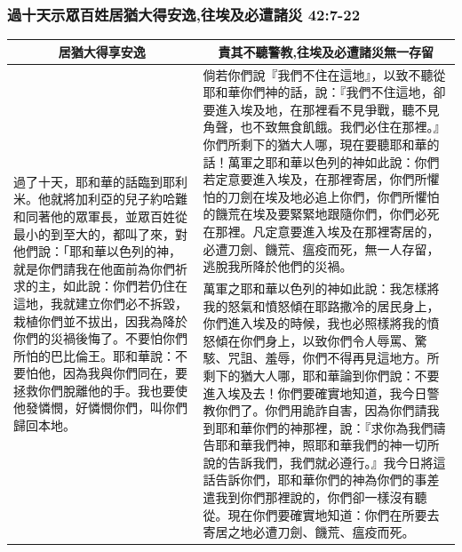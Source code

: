 \subsubsection{過十天示眾百姓居猶大得安逸,往埃及必遭諸災 42:7-22}
\begin{table}[H]
\centering
\begin{tabular}{p{4.8cm}|p{12.50cm}}\hline\hline
\multicolumn{1}{c|}{居猶大得享安逸}&\multicolumn{1}{c}{責其不聽警教,往埃及必遭諸災無一存留}\\\hline
\multirow{2}{5.cm}{過了十天，耶和華的話臨到耶利米。他就將加利亞的兒子約哈難和同著他的眾軍長，並眾百姓從最小的到至大的，都叫了來，對他們說：「耶和華以色列的神，就是你們請我在他面前為你們祈求的主，如此說：你們若仍住在這地，我就建立你們必不拆毀，栽植你們並不拔出，因我為降於你們的災禍後悔了。不要怕你們所怕的巴比倫王。耶和華說：不要怕他，因為我與你們同在，要拯救你們脫離他的手。我也要使他發憐憫，好憐憫你們，叫你們歸回本地。}
&倘若你們說『我們不住在這地』，以致不聽從耶和華你們神的話，說：『我們不住這地，卻要進入埃及地，在那裡看不見爭戰，聽不見角聲，也不致無食飢餓。我們必住在那裡。』你們所剩下的猶大人哪，現在要聽耶和華的話！萬軍之耶和華以色列的神如此說：你們若定意要進入埃及，在那裡寄居，你們所懼怕的刀劍在埃及地必追上你們，你們所懼怕的饑荒在埃及要緊緊地跟隨你們，你們必死在那裡。凡定意要進入埃及在那裡寄居的，必遭刀劍、饑荒、瘟疫而死，無一人存留，逃脫我所降於他們的災禍。\\\cline{2-2}
&萬軍之耶和華以色列的神如此說：我怎樣將我的怒氣和憤怒傾在耶路撒冷的居民身上，你們進入埃及的時候，我也必照樣將我的憤怒傾在你們身上，以致你們令人辱罵、驚駭、咒詛、羞辱，你們不得再見這地方。所剩下的猶大人哪，耶和華論到你們說：不要進入埃及去！你們要確實地知道，我今日警教你們了。你們用詭詐自害，因為你們請我到耶和華你們的神那裡，說：『求你為我們禱告耶和華我們神，照耶和華我們的神一切所說的告訴我們，我們就必遵行。』我今日將這話告訴你們，耶和華你們的神為你們的事差遣我到你們那裡說的，你們卻一樣沒有聽從。現在你們要確實地知道：你們在所要去寄居之地必遭刀劍、饑荒、瘟疫而死。\\\hline
\end{tabular}
\end{table}
 
